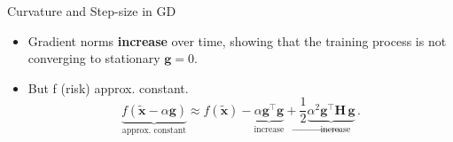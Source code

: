 \documentclass[11pt,compress,t,notes=noshow, xcolor=table]{beamer}
\begin{document}
\begin{vbframe}{Curvature and Step-size in GD}
\begin{itemize}
\item Gradient norms \textbf{increase} over time, showing that the training process is not converging to stationary $\mathbf{g} = 0$. 
\item But f (risk) approx. constant.
\vspace*{-0.2cm}
$$
\underbrace{f(\bm{\tilde{x}}-\alpha \mathbf{g})}_{\text{approx. constant}} \approx f(\bm{\tilde{x}}) - \underbrace{\alpha \mathbf{g}^\top\mathbf{g}}_{\text{increase}}+ \frac{1}{2}  \underbrace{\alpha^2 \mathbf{g}^\top\!\bm{H}\,\mathbf{g}}_{\to \text{increase}}  \,. 
$$ 
\end{itemize}
\end{vbframe}


	
	
	
	
	
	
	
\end{document}
